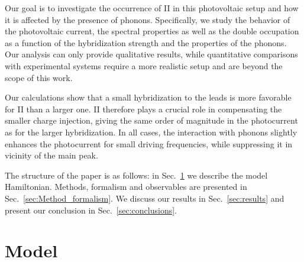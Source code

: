 \documentclass[aps,prb,groupedaddress,showpacs,twocolumn,superscriptaddress,10pt]{revtex4-2}
\begin{document}
Our goal is to investigate the occurrence of II in this photovoltaic setup and how it is affected by the presence of phonons. Specifically, we study the behavior of the photovoltaic current, the spectral properties as well as the double occupation as a function of the hybridization strength and the properties of the phonons. Our analysis can only provide qualitative results, while quantitative comparisons with experimental systems require a more realistic setup and are beyond the scope of this work.
 
Our calculations show that a small hybridization to the leads is more favorable for II than a larger one. II therefore plays a crucial role in compensating the smaller charge injection, giving the same order of magnitude in the photocurrent as for the larger hybridization.
In all cases, the interaction with phonons slightly enhances the photocurrent for small driving frequencies, while suppressing it in vicinity of the main peak.

The structure of the paper is as follows: in Sec.~\ref{sec:Model} we describe the model Hamiltonian. Methods, formalism and observables are presented in Sec.~\ref{sec:Method_formalism}. We discuss our results in Sec.~\ref{sec:results} and present our conclusion in Sec.~\ref{sec:conclusions}. 

\section{Model}
\label{sec:Model}
\end{document}
